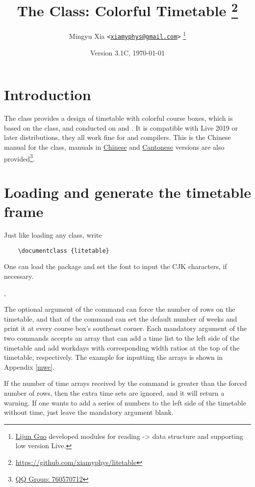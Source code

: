 \documentclass[letterpaper]{l3doc}
\title
{
  \bfseries
  The \cls{litetable} Class: Colorful Timetable
  \thanks{\url{https://github.com/xiamyphys/litetable}}
}
\author
{
  Mingyu Xia \texttt{<\href{mailto:xiamyphys@gmail.com}{xiamyphys@gmail.com}>}
  \thanks{\href{https://github.com/ljguo1020}{Lijun Guo} developed modules for reading \meta{left} -> \meta{right} data structure and supporting low version \hologo {TeX} Live.}
}
\date{Version 3.1C, \today}
\begin{document}
\maketitle

\section{Introduction}

The  class provides a design of timetable with colorful course boxes, which is based on the  class, and conducted on  and . It is compatible with Live 2019 or later distributions, they all work fine for  and  compilers. This is the Chinese manual for the  class, manuals in \href{./litetable-cn.pdf}{Chinese} and \href{./litetable-hk.pdf}{Cantonese} versions are also provided\footnote{\href{https://qm.qq.com/q/RyssAhG4qy}{QQ Group: 760570712}}.

\section{Loading  and generate the timetable frame}

Just like loading any class, write

\begin{framed}
  \begin{verbatim}
    \documentclass {litetable}
  \end{verbatim}
\end{framed}

One can load the  package and set the font to input the CJK characters, if necessary.

\begin{function}{\timelist,\weeklist}
  \begin{syntax}
                  
         
  \end{syntax}

  The optional argument of the command  can force the number of rows on the timetable, and that of the command  can set the default number of weeks and print it at every course box's southeast corner. Each mandatory argument of the two commands accepts an array that can add a time list to the left side of the timetable and add workdays with corresponding width ratios at the top of the timetable, respectively. The example for inputting the arrays is shown in Appendix \ref{mwe}.

  If the number of time arrays received by the command  is greater than the forced number of rows, then the extra time sets are ignored, and it will return a warning. If one wants to add a series of numbers to the left side of the timetable without time, just leave the mandatory argument blank.
\end{function}
\end{document}
